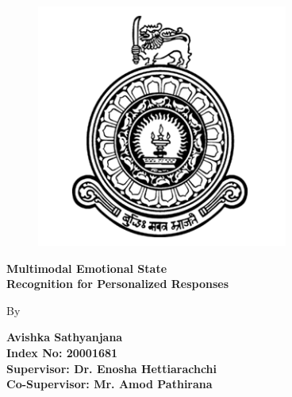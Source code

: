 \begin{titlepage}
    \begin{center}

        
        
        \bigskip
        \begin{figure} [H]
          \centering
          \includegraphics[scale = 0.5]{img/UOC-logo.png}
        \end{figure}
        
        \textbf{\Huge{Multimodal Emotional State \\ Recognition for
Personalized Responses}}
        
        \vspace*{\fill}
        
        
        \large {By}
        
        \vspace{12pt}

        \textbf{{\large{Avishka Sathyanjana \\ Index No: 20001681}}}\\
     
       
    
        \vspace{20pt}
        \textbf{Supervisor: Dr. Enosha Hettiarachchi}\\
        \textbf{Co-Supervisor: Mr. Amod Pathirana}\\
        


\end{center}
\end{titlepage}

